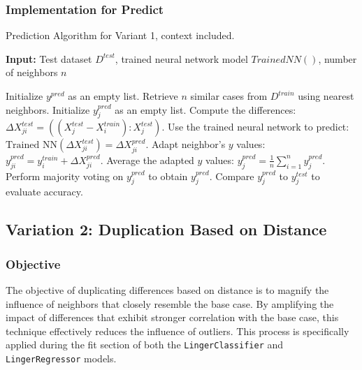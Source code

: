 \documentclass[a4paper, 12pt]{report}
\begin{document}
\subsubsection{Implementation for Predict}

\begin{algorithm}[H]
	\caption{Prediction Algorithm for Variant 1, context included.}
	\label{alg:learning_from_differences_variant_1_predict}
	\textbf{Input:} Test dataset $D^{test}$, trained neural network model $Trained NN()$, number of neighbors $n$
	\begin{algorithmic}[1]
        \State Initialize $y^{pred}$ as an empty list.
			\State Retrieve $n$ similar cases from $D^{train}$ using nearest neighbors.
			\State Initialize $y^{pred}_j$ as an empty list.
				\State Compute the differences: $\Delta X^{test}_{ji} = ((X^{test}_j - X^{train}_i):X^{test}_j)$.
				\State Use the trained neural network to predict: $\text{Trained NN}(\Delta X^{test}_{ji}) = \Delta X^{pred}_{ji}$.
				\State Adapt neighbor's $y$ values: $y^{pred}_{ji} = y^{train}_i + \Delta X^{pred}_{ji}$.
			\EndFor
				\State Average the adapted $y$ values: $y^{pred}_j = \frac{1}{n} \sum_{i=1}^{n} y^{pred}_{j}$.
				\State Perform majority voting on $y^{pred}_j$ to obtain $y^{pred}_j$.
			\EndIf
		\EndFor
		\State Compare $y^{pred}_j$ to $y^{test}_j$ to evaluate accuracy.
	\end{algorithmic}
\end{algorithm}

\subsection{Variation 2: Duplication Based on Distance}

\subsubsection{Objective}
The objective of duplicating differences based on distance is to magnify the influence of neighbors that closely resemble the base case.
By amplifying the impact of differences that exhibit stronger correlation with the base case, this technique effectively reduces the influence of outliers.
This process is specifically applied during the fit section of both the \texttt{LingerClassifier} and \texttt{LingerRegressor} models.
\end{document}
